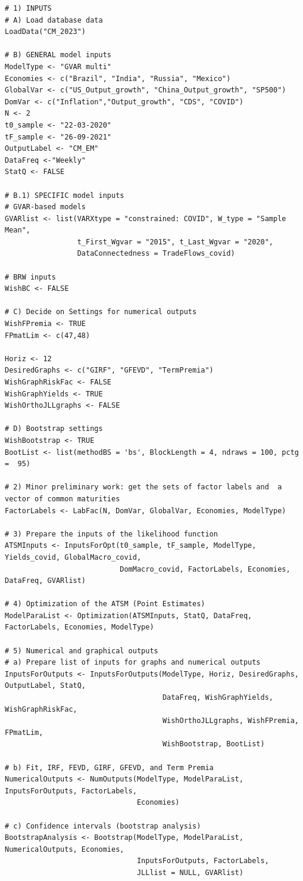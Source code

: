 \begin{verbatim}
# 1) INPUTS
# A) Load database data
LoadData("CM_2023")

# B) GENERAL model inputs
ModelType <- "GVAR multi"
Economies <- c("Brazil", "India", "Russia", "Mexico")
GlobalVar <- c("US_Output_growth", "China_Output_growth", "SP500")
DomVar <- c("Inflation","Output_growth", "CDS", "COVID")
N <- 2
t0_sample <- "22-03-2020"
tF_sample <- "26-09-2021"
OutputLabel <- "CM_EM"
DataFreq <-"Weekly"
StatQ <- FALSE

# B.1) SPECIFIC model inputs
# GVAR-based models
GVARlist <- list(VARXtype = "constrained: COVID", W_type = "Sample Mean",
                 t_First_Wgvar = "2015", t_Last_Wgvar = "2020",
                 DataConnectedness = TradeFlows_covid)

# BRW inputs
WishBC <- FALSE

# C) Decide on Settings for numerical outputs
WishFPremia <- TRUE
FPmatLim <- c(47,48)

Horiz <- 12
DesiredGraphs <- c("GIRF", "GFEVD", "TermPremia")
WishGraphRiskFac <- FALSE
WishGraphYields <- TRUE
WishOrthoJLLgraphs <- FALSE

# D) Bootstrap settings
WishBootstrap <- TRUE
BootList <- list(methodBS = 'bs', BlockLength = 4, ndraws = 100, pctg =  95)

# 2) Minor preliminary work: get the sets of factor labels and  a vector of common maturities
FactorLabels <- LabFac(N, DomVar, GlobalVar, Economies, ModelType)

# 3) Prepare the inputs of the likelihood function
ATSMInputs <- InputsForOpt(t0_sample, tF_sample, ModelType, Yields_covid, GlobalMacro_covid,
                           DomMacro_covid, FactorLabels, Economies, DataFreq, GVARlist)

# 4) Optimization of the ATSM (Point Estimates)
ModelParaList <- Optimization(ATSMInputs, StatQ, DataFreq, FactorLabels, Economies, ModelType)

# 5) Numerical and graphical outputs
# a) Prepare list of inputs for graphs and numerical outputs
InputsForOutputs <- InputsForOutputs(ModelType, Horiz, DesiredGraphs, OutputLabel, StatQ,
                                     DataFreq, WishGraphYields, WishGraphRiskFac,
                                     WishOrthoJLLgraphs, WishFPremia, FPmatLim,
                                     WishBootstrap, BootList)

# b) Fit, IRF, FEVD, GIRF, GFEVD, and Term Premia
NumericalOutputs <- NumOutputs(ModelType, ModelParaList, InputsForOutputs, FactorLabels,
                               Economies)

# c) Confidence intervals (bootstrap analysis)
BootstrapAnalysis <- Bootstrap(ModelType, ModelParaList, NumericalOutputs, Economies,
                               InputsForOutputs, FactorLabels,
                               JLLlist = NULL, GVARlist)
\end{verbatim}

